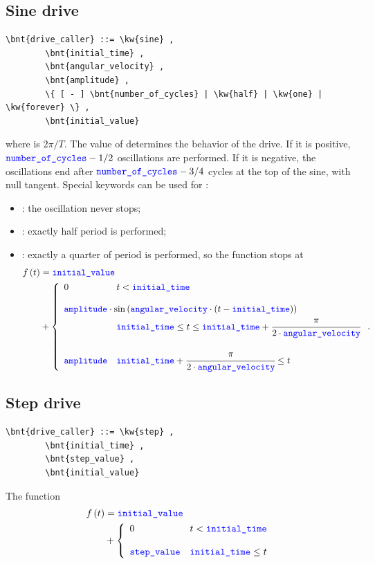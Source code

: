 \subsection{Sine drive}
\begin{Verbatim}[commandchars=\\\{\}]
    \bnt{drive_caller} ::= \kw{sine} ,
        \bnt{initial_time} ,
        \bnt{angular_velocity} ,
        \bnt{amplitude} ,
        \{ [ - ] \bnt{number_of_cycles} | \kw{half} | \kw{one} | \kw{forever} \} , 
        \bnt{initial_value}
\end{Verbatim}
where  is $2\pi/T$.
The value of  determines the behavior of the drive. 
If it is positive, $\nt{number\_of\_cycles}-1/2$ oscillations are performed. 
If it is negative, the oscillations end after 
$\nt{number\_of\_cycles}-3/4$ cycles at the top of the sine, with null
tangent.
Special keywords can be used for :
\begin{itemize}
	\item {}: the oscillation never stops;
	\item {}: exactly half period is performed;
	\item {}: exactly a quarter of period is performed,
	so the function stops at
\begin{align}
	f\plbr{t} &= \nt{initial\_value} \\
	&+ \lcubr{\matr{ll}{
		0 & t < \nt{initial\_time} \\
		\\
		\multicolumn{2}{l}{
		\nt{amplitude} \cdot \sin\plbr{\nt{angular\_velocity} \cdot \plbr{
			t - \nt{initial\_time}
		}}
		} \\
			& \nt{initial\_time} \le t
				\le \nt{initial\_time} + \cfrac{\pi}{2 \cdot \nt{angular\_velocity}} \\
		\\
		\nt{amplitude}
			& \nt{initial\_time} + \cfrac{\pi}{2 \cdot \nt{angular\_velocity}} \le t
	}} \nonumber .
\end{align}
\end{itemize}

\subsection{Step drive}
\begin{Verbatim}[commandchars=\\\{\}]
    \bnt{drive_caller} ::= \kw{step} ,
        \bnt{initial_time} , 
        \bnt{step_value} ,
        \bnt{initial_value}
\end{Verbatim}    
The function
\begin{align}
	f\plbr{t} &= \nt{initial\_value} \nonumber \\
	&+ \lcubr{\matr{ll}{
		0 
			& t < \nt{initial\_time} \\
		\\
		\nt{step\_value}
			& \nt{initial\_time} \le t
	}}
\end{align}

